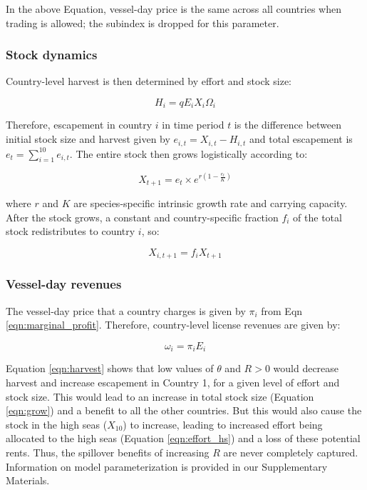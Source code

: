 \documentclass[12pt]{article}
\begin{document}
\noindent In the above Equation, vessel-day price is the same across all countries when trading is allowed; the subindex is dropped for this parameter.

\subsubsection{Stock dynamics}

Country-level harvest is then determined by effort and stock size:

\begin{equation}
H_i = qE_iX_i\Omega_i
\label{eqn:harvest}
\end{equation}


\noindent Therefore, escapement in country $i$ in time period $t$ is the difference between initial stock size and harvest given by $e_{i,t} = X_{i,t} - H_{i,t}$ and total escapement is $e_t=\sum_{i=1}^{10}e_{i,t}$. The entire stock then grows logistically according to:

\begin{equation}
X_{t+1} = e_t \times  e^{r \left(1 - \frac{e_t}{K} \right)}
\label{eqn:grow}
\end{equation}

\noindent where $r$ and $K$ are species-specific intrinsic growth rate and carrying capacity. After the stock grows, a constant and country-specific fraction $f_i$ of the total stock redistributes to country $i$, so:

\begin{equation}
X_{i,t+1} = f_iX_{t+1}
\label{eqn:disperse}
\end{equation}

\subsubsection{Vessel-day revenues}

The vessel-day price that a country charges is given by $\pi_i$ from Eqn \ref{eqn:marginal_profit}. Therefore, country-level license revenues are given by:

\begin{equation}
\omega_i = \pi_iE_i
\label{eqn:license_revenue}
\end{equation}

\noindent Equation \ref{eqn:harvest} shows that low values of $\theta$ and $R > 0$ would decrease harvest and increase escapement in Country 1, for a given level of effort and stock size. This would lead to an increase in total stock size (Equation \ref{eqn:grow}) and a benefit to all the other countries. But this would also cause the stock in the high seas ($X_{10}$) to increase, leading to increased effort being allocated to the high seas (Equation \ref{eqn:effort_hs}) and a loss of these potential rents. Thus, the spillover benefits of increasing $R$ are never completely captured. Information on model parameterization is provided in our Supplementary Materials.
\end{document}
